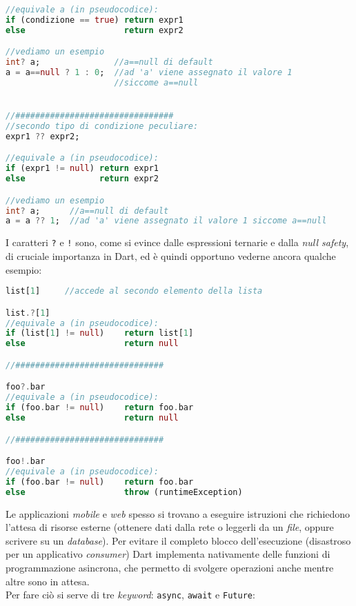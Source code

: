 \begin{appendices}
\begin{lstlisting}[language=dart, firstnumber=1,caption={Dart espressioni ternarie}]
//equivale a (in pseudocodice):
if (condizione == true) return expr1
else                    return expr2

//vediamo un esempio
int? a;               //a==null di default
a = a==null ? 1 : 0;  //ad 'a' viene assegnato il valore 1 
                      //siccome a==null


//################################
//secondo tipo di condizione peculiare:
expr1 ?? expr2;

//equivale a (in pseudocodice):
if (expr1 != null) return expr1
else               return expr2

//vediamo un esempio
int? a;      //a==null di default
a = a ?? 1;  //ad 'a' viene assegnato il valore 1 siccome a==null
\end{lstlisting}

I caratteri \verb+?+ e \verb+!+ sono, come si evince dalle espressioni ternarie e dalla \textit{null safety}, di cruciale importanza in Dart, ed è quindi opportuno vederne ancora qualche esempio:

\begin{lstlisting}[language=dart, firstnumber=1,caption={Dart operatori '?' e '!'}]
list[1]     //accede al secondo elemento della lista

list.?[1]
//equivale a (in pseudocodice):
if (list[1] != null)    return list[1]
else                    return null

//##############################

foo?.bar 
//equivale a (in pseudocodice):
if (foo.bar != null)    return foo.bar
else                    return null

//##############################

foo!.bar
//equivale a (in pseudocodice):
if (foo.bar != null)    return foo.bar
else                    throw (runtimeException)
\end{lstlisting}

Le applicazioni \textit{mobile} e \textit{web} spesso si trovano a eseguire istruzioni che richiedono l'attesa di risorse esterne (ottenere dati dalla rete o leggerli da un \textit{file}, oppure scrivere su un \textit{database}). Per evitare il completo blocco dell'esecuzione (disastroso per un applicativo \textit{consumer}) Dart implementa nativamente delle funzioni di programmazione asincrona, che permetto di svolgere operazioni anche mentre altre sono in attesa.\\
Per fare ciò si serve di tre \textit{keyword}: \verb+async+, \verb+await+ e \verb+Future+:


\end{appendices}
